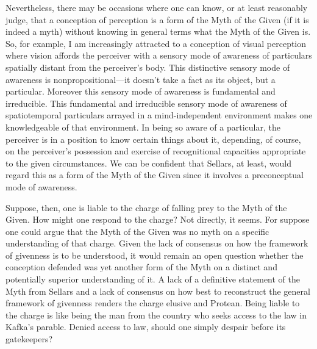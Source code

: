 \documentclass[12pt]{article}
\begin{document}
Nevertheless, there may be occasions where one can know, or at least reasonably judge, that a conception of perception is a form of the Myth of the Given (if it is indeed a myth) without knowing in general terms what the Myth of the Given is. So, for example, I am increasingly attracted to a conception of visual perception where vision affords the perceiver with a sensory mode of awareness of particulars spatially distant from the perceiver's body. This distinctive sensory mode of awareness is nonpropositional---\-it doesn't take a fact as its object, but a particular. Moreover this sensory mode of awareness is fundamental and irreducible. This fundamental and irreducible sensory mode of awareness of spatiotemporal particulars arrayed in a mind-independent environment makes one knowledgeable of that environment. In being so aware of a particular, the perceiver is in a position to know certain things about it, depending, of course, on the perceiver's possession and exercise of recognitional capacities appropriate to the given circumstances. We can be confident that Sellars, at least, would regard this as a form of the Myth of the Given since it involves a preconceptual mode of awareness.

Suppose, then, one is liable to the charge of falling prey to the Myth of the Given. How might one respond to the charge? Not directly, it seems. For suppose one could argue that the Myth of the Given was no myth on a specific understanding of that charge. Given the lack of consensus on how the framework of givenness is to be understood, it would remain an open question whether the conception defended was yet another form of the Myth on a distinct and potentially superior understanding of it. A lack of a definitive statement of the Myth from Sellars and a lack of consensus on how best to reconstruct the general framework of givenness renders the charge elusive and Protean. Being liable to the charge is like being the man from the country who seeks access to the law in Kafka's parable. Denied access to law, should one simply despair before its gatekeepers?
\end{document}
